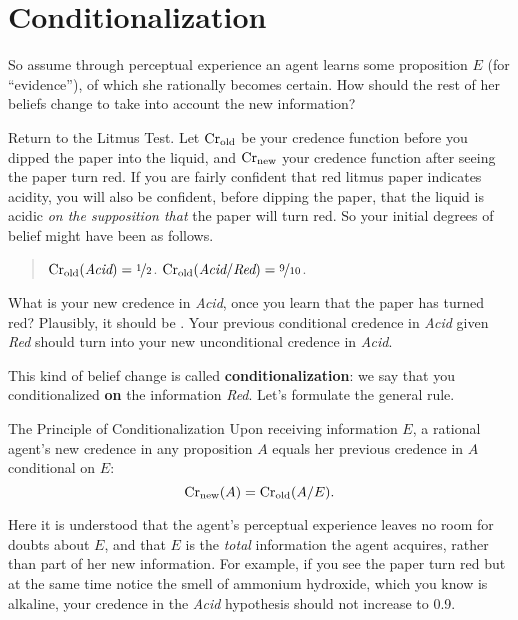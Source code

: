 \section{Conditionalization}\label{sec:conditionalization}

So assume through perceptual experience an agent learns some
proposition $E$ (for ``evidence''), of which she rationally becomes
certain. How should the rest of her beliefs change to take into
account the new information?

Return to the Litmus Test. Let $\text{Cr$_{\text{old}}$}$ be your credence function before
you dipped the paper into the liquid, and $\text{Cr$_{\text{new}}$}$ your credence
function after seeing the paper turn red. If you are fairly confident
that red litmus paper indicates acidity, you will also be confident,
before dipping the paper, that the liquid is acidic \emph{on the
  supposition that} the paper will turn red. So your initial degrees
of belief might have been as follows.

\begin{quote}
$\text{Cr$_{\text{old}}$}(\emph{Acid}) = \nicefrac{1}{2}$.\newline
$\text{Cr$_{\text{old}}$}(\emph{Acid}/\emph{Red}) = \nicefrac{9}{10}$.
\end{quote}

What is your new credence in \emph{Acid}, once you learn that the
paper has turned red? Plausibly, it should be . Your
previous conditional credence in \emph{Acid} given \emph{Red} should
turn into your new unconditional credence in \emph{Acid}.

This kind of belief change is called \textbf{conditionalization}: we
say that you conditionalized \textbf{on} the information
\emph{Red}. Let's formulate the general rule.

\begin{genericthm}{The Principle of Conditionalization}
  Upon receiving information $E$, a rational agent's new credence
  in any proposition $A$ equals her previous credence in $A$
  conditional on $E$: 
  \[
    \text{Cr}_\text{new}(A) = \text{Cr}_\text{old}(A/E).
  \]
\end{genericthm}
%
Here it is understood that the agent's perceptual experience leaves no
room for doubts about $E$, and that $E$ is the \emph{total}
information the agent acquires, rather than part of her new
information. For example, if you see the paper turn red but at the
same time notice the smell of ammonium hydroxide, which you know is
alkaline, your credence in the \emph{Acid} hypothesis should not
increase to 0.9.

